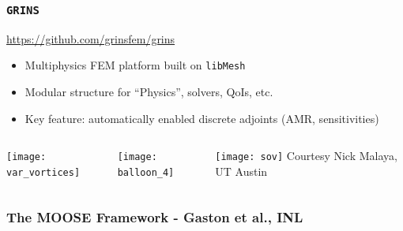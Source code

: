 \documentclass[mathserif]{beamer}
\newcommand{\software}[1]{{\texttt{#1}}}
\newcommand{\libMesh}{\software{libMesh}}
\newcommand{\GRINS}{\software{GRINS}}
\begin{document}
\begin{frame}
\frametitle{\GRINS}

\begin{block}{\url{https://github.com/grinsfem/grins}}
  \begin{itemize}
  \item Multiphysics FEM platform built on \libMesh{}
  \item Modular structure for ``Physics'', solvers, QoIs, etc.
  \item Key feature: automatically enabled discrete adjoints (AMR, sensitivities)
  \end{itemize}
\end{block}

\begin{columns}[T]
  \begin{column}{0.4\textwidth}
    \centerline{\texttt{[image: var\_vortices]}}
  \end{column}
  \begin{column}{0.4\textwidth}
    \centerline{\texttt{[image: balloon\_4]}}
  \end{column}
  \begin{column}{0.2\textwidth}
    \centerline{\texttt{[image: sov]}
    \tiny{Courtesy Nick Malaya, UT Austin}}
  \end{column}
  \end{columns}

\end{frame}



\frame
{
  \frametitle{The MOOSE Framework - Gaston et al., INL}
  \begin{center}
  \end{center}
}
\end{document}
